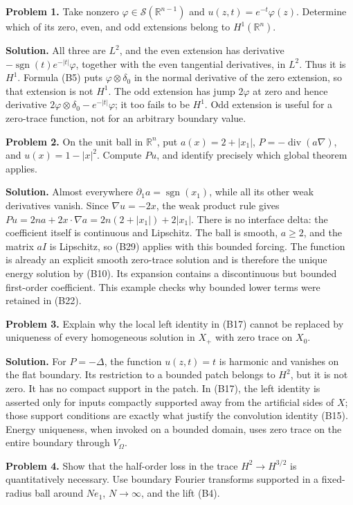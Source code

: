 \documentclass[
  11pt,
]{article}
\begin{document}
\textbf{Problem 1.} Take nonzero
\(\varphi\in\mathcal S(\mathbb R^{n-1})\) and
\(u(z,t)=e^{-t}\varphi(z)\). Determine which of its zero, even, and odd
extensions belong to \(H^1(\mathbb R^n)\).

\textbf{Solution.} All three are \(L^2\), and the even extension has
derivative \(-\operatorname{sgn}(t)e^{-|t|}\varphi\), together with the
even tangential derivatives, in \(L^2\). Thus it is \(H^1\). Formula
(B5) puts \(\varphi\otimes\delta_0\) in the normal derivative of the
zero extension, so that extension is not \(H^1\). The odd extension has
jump \(2\varphi\) at zero and hence derivative
\(2\varphi\otimes\delta_0-e^{-|t|}\varphi\); it too fails to be \(H^1\).
Odd extension is useful for a zero-trace function, not for an arbitrary
boundary value.

\textbf{Problem 2.} On the unit ball in \(\mathbb R^n\), put
\(a(x)=2+|x_1|\), \(P=-\operatorname{div}(a\nabla)\), and
\(u(x)=1-|x|^2\). Compute \(Pu\), and identify precisely which global
theorem applies.

\textbf{Solution.} Almost everywhere
\(\partial_1a=\operatorname{sgn}(x_1)\), while all its other weak
derivatives vanish. Since \(\nabla u=-2x\), the weak product rule gives
\(Pu=2na+2x\cdot\nabla a=2n(2+|x_1|)+2|x_1|\). There is no interface
delta: the coefficient itself is continuous and Lipschitz. The ball is
smooth, \(a\geq2\), and the matrix \(aI\) is Lipschitz, so (B29) applies
with this bounded forcing. The function is already an explicit smooth
zero-trace solution and is therefore the unique energy solution by
(B10). Its expansion contains a discontinuous but bounded first-order
coefficient. This example checks why bounded lower terms were retained
in (B22).

\textbf{Problem 3.} Explain why the local left identity in (B17) cannot
be replaced by uniqueness of every homogeneous solution in \(X_+\) with
zero trace on \(X_0\).

\textbf{Solution.} For \(P=-\Delta\), the function \(u(z,t)=t\) is
harmonic and vanishes on the flat boundary. Its restriction to a bounded
patch belongs to \(H^2\), but it is not zero. It has no compact support
in the patch. In (B17), the left identity is asserted only for inputs
compactly supported away from the artificial sides of \(X\); those
support conditions are exactly what justify the convolution identity
(B15). Energy uniqueness, when invoked on a bounded domain, uses zero
trace on the entire boundary through \(V_\Omega\).

\textbf{Problem 4.} Show that the half-order loss in the trace
\(H^2\to H^{3/2}\) is quantitatively necessary. Use boundary Fourier
transforms supported in a fixed-radius ball around \(Ne_1\),
\(N\to\infty\), and the lift (B4).
\end{document}
